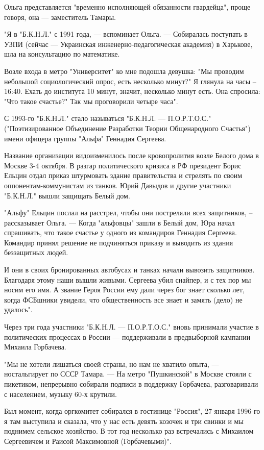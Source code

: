 \documentclass[a4paper,11pt]{extreport}
\begin{document}
Ольга представляется "временно исполняющей обязанности гвардейца", проще
говоря, она --- заместитель Тамары.

"Я в "Б.К.Н.Л." с 1991 года, --- вспоминает Ольга. --- Собиралась поступать в УЗПИ
(сейчас --- Украинская инженерно-педагогическая академия) в Харькове, шла на
консультацию по математике. 

Возле входа в метро "Университет" ко мне подошла девушка: "Мы проводим
небольшой социологический опрос, есть несколько минут?" Я глянула на часы –
16:40. Ехать до института 10 минут, значит, несколько минут есть. Она спросила:
"Что такое счастье?" Так мы проговорили четыре часа".

С 1993-го "Б.К.Н.Л." стало называться "Б.К.Н.Л. --- П.О.Р.Т.О.С."
("Поэтизированное Объединение Разработки Теории Общенародного Счастья") имени
офицера группы "Альфа" Геннадия Сергеева. 

Название организации видоизменилось после кровопролития возле Белого дома в
Москве 3-4 октября. В разгар политического кризиса в РФ президент Борис Ельцин
отдал приказ штурмовать здание правительства и стрелять по своим
оппонентам-коммунистам из танков. Юрий Давыдов и другие участники "Б.К.Н.Л."
вышли защищать Белый дом.

"Альфу" Ельцин послал на расстрел, чтобы они постреляли всех защитников, –
рассказывает Ольга. --- Когда "альфовцы" зашли в Белый дом, Юра начал спрашивать,
что такое счастье у одного из командиров Геннадия Сергеева. Командир принял
решение не подчиняться приказу и выводить из здания беззащитных людей. 

И они в своих бронированных автобусах и танках начали вывозить защитников.
Благодаря этому наши вышли живыми. Сергеева убил снайпер, и с тех пор мы носим
его имя. А звание Героя России ему дали через бог знает сколько лет, когда
ФСБшники увидели, что общественность все знает и замять (дело) не удалось".

Через три года участники "Б.К.Н.Л. --- П.О.Р.Т.О.С." вновь принимали участие в
политических процессах в России --- поддерживали в предвыборной кампании Михаила
Горбачева.

"Мы не хотели лишаться своей страны, но нам не хватило опыта, --- ностальгирует
по СССР Тамара. --- На метро "Пушкинской" в Москве стояли с пикетиком, непрерывно
собирали подписи в поддержку Горбачева, разговаривали с населением, музыку 60-х
крутили. 

Был момент, когда оргкомитет собирался в гостинице "Россия", 27 января 1996-го
я там выступила и сказала, что у нас есть девять козочек и три свинки и мы
поднимем сельское хозяйство. В тот год несколько раз встречались с Михаилом
Сергеевичем и Раисой Максимовной (Горбачевыми)".
\end{document}
